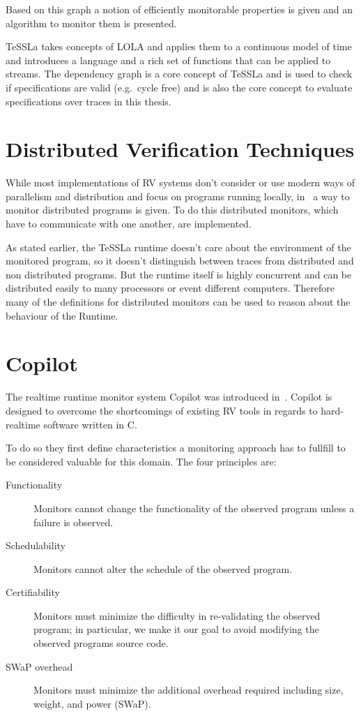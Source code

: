 Based on this graph a notion of efficiently monitorable properties is given and an algorithm to monitor them is presented.

TeSSLa takes concepts of LOLA and applies them to a continuous model of time and introduces a language and a rich set of functions that can be applied to streams.
The dependency graph is a core concept of TeSSLa and is used to check if specifications are valid (e.g.\ cycle free) and is also the core concept to evaluate specifications over traces in this thesis.

\section{Distributed Verification Techniques}
\label{sec:related:distributed}

While most implementations of RV systems don't consider or use modern ways of parallelism and distribution and focus on programs running locally, in~\cite{Mostafa2015} a way to monitor distributed programs is given.
To do this distributed monitors, which have to communicate with one another, are implemented.

As stated earlier, the TeSSLa runtime doesn't care about the environment of the monitored program, so it doesn't distinguish between traces from distributed and non distributed programs.
But the runtime itself is highly concurrent and can be distributed easily to many processors or event different computers.
Therefore many of the definitions for distributed monitors can be used to reason about the behaviour of the Runtime.


\section{Copilot}
\label{sec:related:copilot}

The realtime runtime monitor system Copilot was introduced in~\cite{Pike2010}.
Copilot is designed to overcome the shortcomings of existing RV tools in regards to hard-realtime software written in C.

To do so they first define characteristics a monitoring approach has to fullfill to be considered valuable for this domain.
The four principles are:

\begin{description}
  \item[Functionality] Monitors cannot change the functionality of the observed program unless a failure is observed.
  \item[Schedulability] Monitors cannot alter the schedule of the observed program.
  \item[Certifiability] Monitors must minimize the difficulty in re-validating the observed program; in particular, we make it our goal to avoid modifying the observed programs source code.
  \item[SWaP overhead] Monitors must minimize the additional overhead required including size, weight, and power (SWaP).
\end{description}

